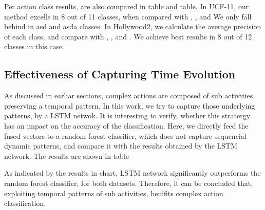 Per action class results, are also compared in table and table. In UCF-11, our method excells
in 8 out of 11 classes, when compared with \cite{}, \cite{}, \cite{} and \cite{} We only fall behind in asd and asda classes. In Hollywood2,
we calculate the average precision of each class, and compare with \cite{}, \cite{}, \cite{} and \cite{}.
We achieve best results in 8 out of 12 classes in this case. 






\subsection{Effectiveness of Capturing Time Evolution}
As discussed in earliar sections, complex actions are composed of sub activities, preserving
a temporal pattern. In this work, we try to capture those underlying patterns, by a LSTM netwok.
It is interesting to verify, whether this stratergy has an impact on the accuracy of the 
classification. Here, we directly feed the fused vectors to a random forest classifier, which
does not capture sequencial dynamic patterns, and compare it with the results obtained by
the LSTM network. The results are shown in table

As indicated by the results in chart, LSTM network significantly outperforms the 
random forest classifier, for both datasets. Therefore, it can be concluded that, exploiting 
temporal patterns of sub activities, benifits complex action classification. 






